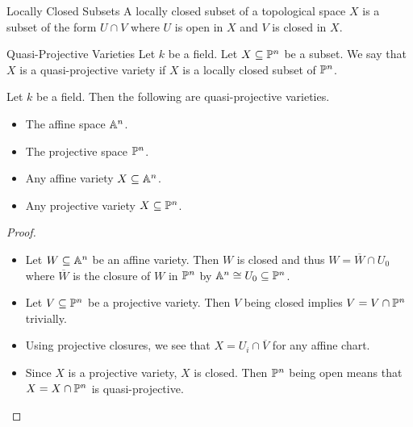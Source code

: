 \documentclass[a4paper]{article}
\begin{document}
\begin{defn}{Locally Closed Subsets}{} A locally closed subset of a topological space $X$ is a subset of the form $U\cap V$ where $U$ is open in $X$ and $V$ is closed in $X$. 
\end{defn}

\begin{defn}{Quasi-Projective Varieties}{} Let $k$ be a field. Let $X\subseteq\mathbb{P}^n$ be a subset. We say that $X$ is a quasi-projective variety if $X$ is a locally closed subset of $\mathbb{P}^n$. 
\end{defn}

\begin{prp}{}{} Let $k$ be a field. Then the following are quasi-projective varieties. 
\begin{itemize}
\item The affine space $\mathbb{A}^n$. 
\item The projective space $\mathbb{P}^n$. 
\item Any affine variety $X\subseteq\mathbb{A}^n$. 
\item Any projective variety $X\subseteq\mathbb{P}^n$. 
\end{itemize} \tcbline
\begin{proof}~\\
\begin{itemize}
\item Let $W\subseteq\mathbb{A}^n$ be an affine variety. Then $W$ is closed and thus $W=\overline{W}\cap U_0$ where $\overline{W}$ is the closure of $W$ in $\mathbb{P}^n$ by $\mathbb{A}^n\cong U_0\subseteq\mathbb{P}^n$. 
\item Let $V\subseteq\mathbb{P}^n$ be a projective variety. Then $V$ being closed implies $V=V\cap\mathbb{P}^n$ trivially. 
\item Using projective closures, we see that $X=U_i\cap\overline{V}$ for any affine chart. 
\item Since $X$ is a projective variety, $X$ is closed. Then $\mathbb{P}^n$ being open means that $X=X\cap\mathbb{P}^n$ is quasi-projective. 
\end{itemize}
\end{proof}
\end{prp}
\end{document}
